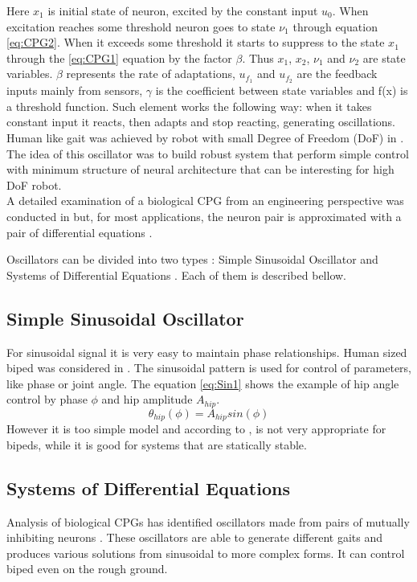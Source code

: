 \documentclass[12pt,a4paper]{report}
\begin{document}
		Here $x_1$  is initial state of neuron, excited by the constant input $u_0$. When excitation reaches some threshold neuron goes to state $\nu_1$ through equation \ref{eq:CPG2}. When it exceeds some threshold it starts to suppress to the state $x_1$ through the \ref{eq:CPG1} equation by the factor $\beta$. Thus $x_1$, $x_2$, $\nu_1$ and $\nu_2$ are state variables. $\beta$ represents the rate of adaptations, $u_{f_1}$ and $u_{f_2}$ are the feedback inputs mainly from sensors, $\gamma$ is the coefficient between state variables and f(x) is a threshold function. Such element works the following way: when it takes constant input it reacts, then adapts and stop reacting, generating oscillations. \\ Human like gait was achieved by robot with small Degree of Freedom (DoF) in \cite{miyakoshi1998three}. The idea of this oscillator was to build robust system that perform simple control with minimum structure of neural architecture that can be interesting for high DoF robot.\\
		A detailed examination of a biological CPG from an engineering perspective was conducted in \cite{zhu2006central} but, for most applications, the neuron pair is approximated with a pair of differential equations \cite{wright2014intelligent}.

		Oscillators can be divided into two types : Simple Sinusoidal Oscillator and Systems of Differential Equations \cite{wright2014intelligent}. Each of them is described bellow.

		\subsection{Simple Sinusoidal Oscillator}
			For sinusoidal signal it is very easy to maintain phase relationships. Human sized biped was considered in \cite{morimoto2008biologically}. The sinusoidal pattern is used for control of parameters, like phase or joint angle. The equation \ref{eq:Sin1} shows the example of hip angle control by phase $\phi$ and hip amplitude $A_{hip}$.
			\begin{equation}\label{eq:Sin1}
				\theta_{hip} (\phi) = A_{hip} sin(\phi) 
			\end{equation}
 			However it is too simple model and according to \cite{wright2014intelligent}, is not very appropriate for bipeds, while it is good for systems that are statically stable. 
		\subsection{Systems of Differential Equations}
			Analysis of biological CPGs has identified oscillators made from pairs of mutually inhibiting neurons \cite{grillner1995neural}. These oscillators are able to generate different gaits and produces various solutions from sinusoidal to more complex forms. It can control biped even on the rough ground.
\end{document}
